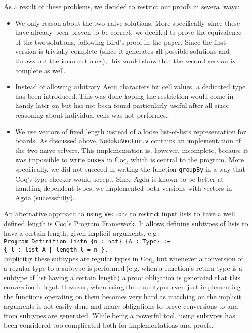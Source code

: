 \documentclass[a4paper,11pt]{article}
\begin{document}
As a result of these problems, we decided to restrict our proofs in several ways:
\begin{itemize}
  \item We only reason about the two naive solutions. More specifically, since these have already been proven to be correct, we decided to prove the equivalence of the two solutions, following Bird's proof in the paper. Since the first version is trivially complete (since it generates all possible solutions and throws out the incorrect ones), this would show that the second version is complete as well.
  \item Instead of allowing arbitrary Ascii characters for cell values, a dedicated type has been introduced. This was done hoping the restriction would come in handy later on but has not been found particularly useful after all since reasoning about individual cells was not performed.
  \item We use vectors of fixed length instead of a loose list-of-lists representation for boards. As discussed above, \texttt{SudokuVector.v} contains an implementation of the two naive solvers. This implementation is, however, incomplete, because it was impossible to write \texttt{boxes} in Coq, which is central to the program. More specifically, we did not succeed in writing the function \texttt{groupBy} in a way that Coq's type checker would accept. Since Agda is known to be better at handling dependent types, we implemented both versions with vectors in Agda (successfully). 
\end{itemize} 

An alternative approach to using \texttt{Vector}s to restrict input lists to have a well defined length is Coq's Program Framework. It allows defining subtypes of lists to have a certain length, given implicit arguments, e.g.:\\
  \texttt{Program Definition listn \{n : nat\} \{A : Type\} :=\\
    \{ l : list A | length l = n \}.}\\
  Implicitly these subtypes are regular types in Coq, but whenever a conversion of a regular type to a subtype is performed (e.g. when a function's return type is a subtype of list having a certain length) a proof obligation is generated that this conversion is legal. However, when using these subtypes even just implementing the functions operating on them becomes very hard as matching on the implicit arguments is not easily done and many obligations to prove conversions to and from subtypes are generated. While being a powerful tool, using subtypes has been considered too complicated both for implementations and proofs.
\end{document}
